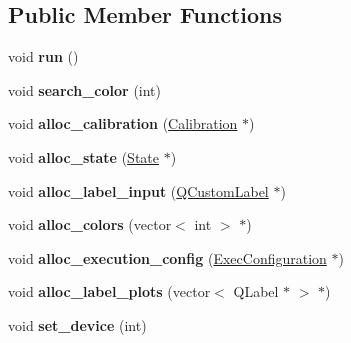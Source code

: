 \subsection*{Public Member Functions}
\begin{DoxyCompactItemize}
\item 
\hypertarget{classvision_ad213bf1ae76ed6a489390c501fe1b4e0}{void {\bfseries run} ()}\label{classvision_ad213bf1ae76ed6a489390c501fe1b4e0}

\item 
\hypertarget{classvision_a908d37e077c8844e2bfd5b38a1f65577}{void {\bfseries search\-\_\-color} (int)}\label{classvision_a908d37e077c8844e2bfd5b38a1f65577}

\item 
\hypertarget{classvision_a81fd57a35d8e331f844e1d276d8272f6}{void {\bfseries alloc\-\_\-calibration} (\hyperlink{structcommon_1_1Calibration}{Calibration} $\ast$)}\label{classvision_a81fd57a35d8e331f844e1d276d8272f6}

\item 
\hypertarget{classvision_a4f8eec2ffc63e3a2b3e76c347b13f537}{void {\bfseries alloc\-\_\-state} (\hyperlink{structcommon_1_1State}{State} $\ast$)}\label{classvision_a4f8eec2ffc63e3a2b3e76c347b13f537}

\item 
\hypertarget{classvision_a5951eb6e1bb8582b3f01dec96d3ad3ac}{void {\bfseries alloc\-\_\-label\-\_\-input} (\hyperlink{classQCustomLabel}{Q\-Custom\-Label} $\ast$)}\label{classvision_a5951eb6e1bb8582b3f01dec96d3ad3ac}

\item 
\hypertarget{classvision_a5d366b880029815afed304c1d2d29bfc}{void {\bfseries alloc\-\_\-colors} (vector$<$ int $>$ $\ast$)}\label{classvision_a5d366b880029815afed304c1d2d29bfc}

\item 
\hypertarget{classvision_a3d623a2e736f204716f1d44bf496823f}{void {\bfseries alloc\-\_\-execution\-\_\-config} (\hyperlink{structcommon_1_1ExecConfiguration}{Exec\-Configuration} $\ast$)}\label{classvision_a3d623a2e736f204716f1d44bf496823f}

\item 
\hypertarget{classvision_a75142dd50f6818ae2d954a1070b7e721}{void {\bfseries alloc\-\_\-label\-\_\-plots} (vector$<$ Q\-Label $\ast$ $>$ $\ast$)}\label{classvision_a75142dd50f6818ae2d954a1070b7e721}

\item 
\hypertarget{classvision_af1d8cd9e34b8bd73d9c8b6eabc235936}{void {\bfseries set\-\_\-device} (int)}\label{classvision_af1d8cd9e34b8bd73d9c8b6eabc235936}


\end{DoxyCompactItemize}
